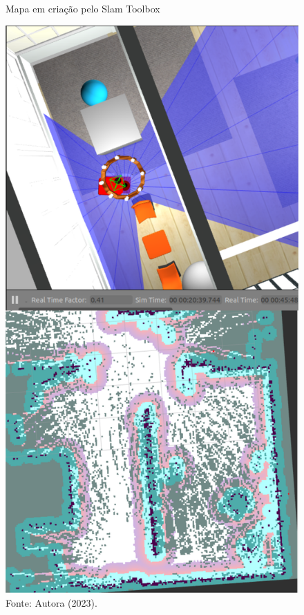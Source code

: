 \begin{figure}[H]
    \centering
    \caption{Mapa em criação pelo Slam Toolbox}
    \includegraphics[scale=0.2]{mapRVIZ.png}
    \caption*{Fonte: Autora (2023).}
    \label{fig:mapaRviz}
\end{figure}

